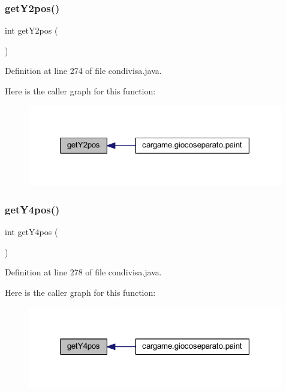 \subsubsection{\texorpdfstring{get\+Y2pos()}{getY2pos()}}
{\footnotesize\ttfamily int get\+Y2pos (\begin{DoxyParamCaption}{ }\end{DoxyParamCaption})}



Definition at line 274 of file condivisa.\+java.

Here is the caller graph for this function\+:
\nopagebreak
\begin{figure}[H]
\begin{center}
\leavevmode
\includegraphics[width=316pt]{classcargame_1_1condivisa_a70ced89b8879d050051033efae073c12_icgraph}
\end{center}
\end{figure}
\mbox{\label{classcargame_1_1condivisa_a8cf00057de784a7a6340baa7d77378db}} 
\subsubsection{\texorpdfstring{get\+Y4pos()}{getY4pos()}}
{\footnotesize\ttfamily int get\+Y4pos (\begin{DoxyParamCaption}{ }\end{DoxyParamCaption})}



Definition at line 278 of file condivisa.\+java.

Here is the caller graph for this function\+:
\nopagebreak
\begin{figure}[H]
\begin{center}
\leavevmode
\includegraphics[width=316pt]{classcargame_1_1condivisa_a8cf00057de784a7a6340baa7d77378db_icgraph}
\end{center}
\end{figure}
\mbox{\label{classcargame_1_1condivisa_aeb24cee3959c82e3fa622c2ceaf59cc9}} 

